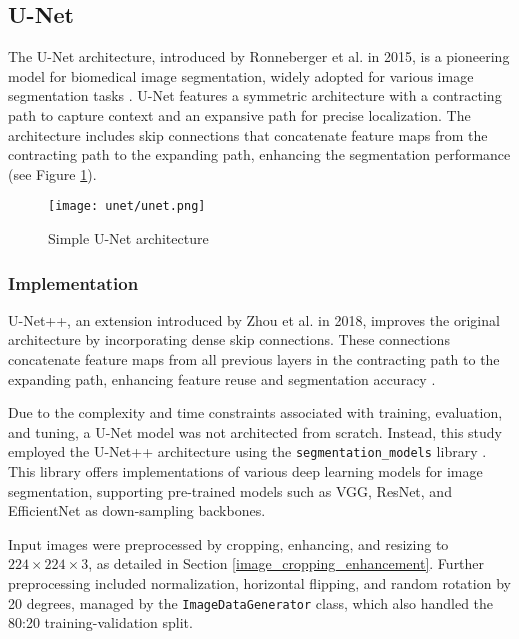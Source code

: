 \subsection{U-Net}\label{s:unet}

The U-Net architecture, introduced by Ronneberger et al. in 2015, is a pioneering model for biomedical image segmentation, widely adopted for various image segmentation tasks \cite{ronneberger_u-net_2015}. U-Net features a symmetric architecture with a contracting path to capture context and an expansive path for precise localization. The architecture includes skip connections that concatenate feature maps from the contracting path to the expanding path, enhancing the segmentation performance (see Figure \ref{f:unet}).

\begin{figure}[H] 
	\centering
	\texttt{[image: unet/unet.png]}
	\caption{Simple U-Net architecture}\label{f:unet}
\end{figure}

\subsubsection{Implementation}

U-Net++, an extension introduced by Zhou et al. in 2018, improves the original architecture by incorporating dense skip connections. These connections concatenate feature maps from all previous layers in the contracting path to the expanding path, enhancing feature reuse and segmentation accuracy \cite{zhou_unet_2018}.

Due to the complexity and time constraints associated with training, evaluation, and tuning, a U-Net model was not architected from scratch. Instead, this study employed the U-Net++ architecture using the \texttt{segmentation\_models} library \cite{Yakubovskiy_2019}. This library offers implementations of various deep learning models for image segmentation, supporting pre-trained models such as VGG, ResNet, and EfficientNet as down-sampling backbones.

Input images were preprocessed by cropping, enhancing, and resizing to $224 \times 224 \times 3$, as detailed in Section \ref{image_cropping_enhancement}. Further preprocessing included normalization, horizontal flipping, and random rotation by 20 degrees, managed by the \texttt{ImageDataGenerator} class, which also handled the 80:20 training-validation split.

